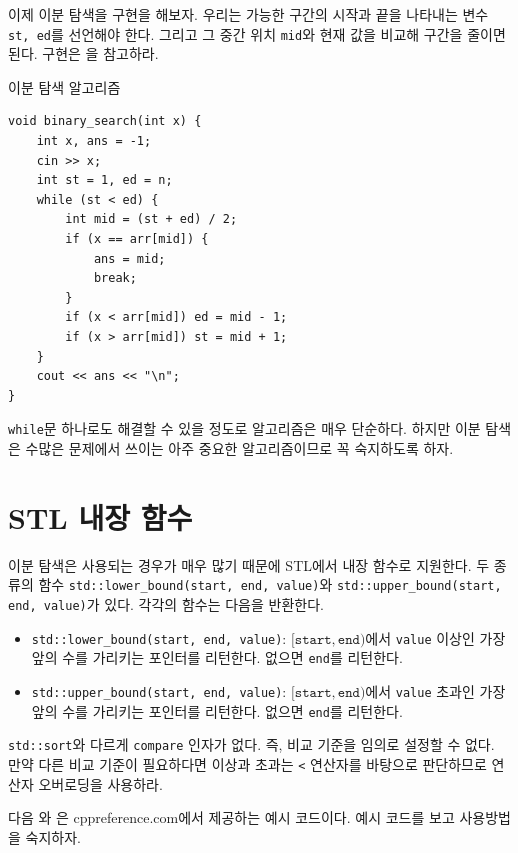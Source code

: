이제 이분 탐색을 구현을 해보자. 우리는 가능한 구간의 시작과 끝을 나타내는 변수 \texttt{st, ed}를 선언해야 한다. 그리고 그 중간 위치 \texttt{mid}와 현재 값을 비교해 구간을 줄이면 된다. 구현은 을 참고하라.

\begin{code} \label{code: binary-search}
이분 탐색 알고리즘
\begin{lstlisting}
void binary_search(int x) {
    int x, ans = -1;
    cin >> x;
    int st = 1, ed = n;
    while (st < ed) {
        int mid = (st + ed) / 2;
        if (x == arr[mid]) {
            ans = mid;
            break;
        }
        if (x < arr[mid]) ed = mid - 1;
        if (x > arr[mid]) st = mid + 1;
    }
    cout << ans << "\n";
}
\end{lstlisting}
\end{code}

\texttt{while}문 하나로도 해결할 수 있을 정도로 알고리즘은 매우 단순하다. 하지만 이분 탐색은 수많은 문제에서 쓰이는 아주 중요한 알고리즘이므로 꼭 숙지하도록 하자.

\section{STL 내장 함수}
이분 탐색은 사용되는 경우가 매우 많기 때문에 STL에서 내장 함수로 지원한다. 두 종류의 함수 \texttt{std::lower\_bound(start, end, value)}와 \texttt{std::upper\_bound(start, end, value)}가 있다. 각각의 함수는 다음을 반환한다.

\begin{itemize}
    \item \texttt{std::lower\_bound(start, end, value)}: $[\texttt{start}, \texttt{end})$에서 \texttt{value} 이상인 가장 앞의 수를 가리키는 포인터를 리턴한다. 없으면 \texttt{end}를 리턴한다.
    \item \texttt{std::upper\_bound(start, end, value)}: $[\texttt{start}, \texttt{end})$에서 \texttt{value} 초과인 가장 앞의 수를 가리키는 포인터를 리턴한다. 없으면 \texttt{end}를 리턴한다.
\end{itemize}

\texttt{std::sort}와 다르게 \texttt{compare} 인자가 없다. 즉, 비교 기준을 임의로 설정할 수 없다. 만약 다른 비교 기준이 필요하다면 이상과 초과는 \texttt{<} 연산자를 바탕으로 판단하므로 연산자 오버로딩을 사용하라.

다음 와 은 cppreference.com에서 제공하는 예시 코드이다. 예시 코드를 보고 사용방법을 숙지하자.

